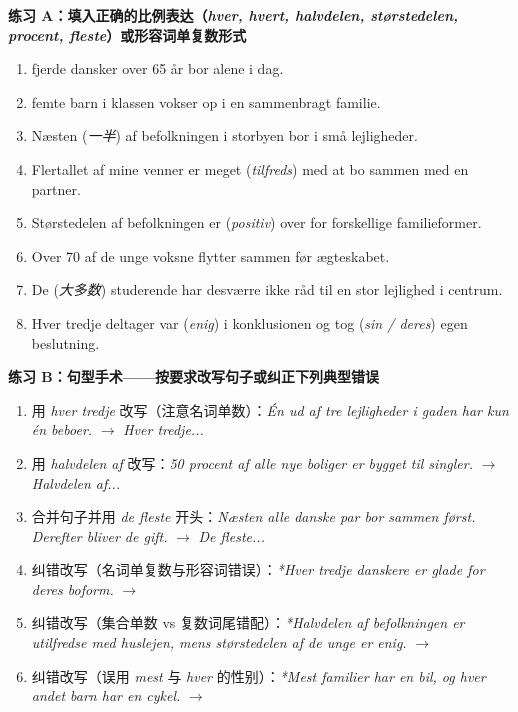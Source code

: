 \textbf{练习 A：填入正确的比例表达（\textit{hver, hvert, halvdelen, størstedelen, procent, fleste}）或形容词单复数形式}
\begin{enumerate}
  \item \underline{\hspace{1.4cm}} fjerde dansker over 65 år bor alene i dag.
  \item \underline{\hspace{1.4cm}} femte barn i klassen vokser op i en sammenbragt familie.
  \item Næsten \underline{\hspace{2.0cm}} (\textit{一半}) af befolkningen i storbyen bor i små lejligheder.
  \item Flertallet af mine venner er meget \underline{\hspace{1.8cm}} (\textit{tilfreds}) med at bo sammen med en partner.
  \item Størstedelen af befolkningen er \underline{\hspace{1.8cm}} (\textit{positiv}) over for forskellige familieformer.
  \item Over 70 \underline{\hspace{1.8cm}} af de unge voksne flytter sammen før ægteskabet.
  \item De \underline{\hspace{1.6cm}} (\textit{大多数}) studerende har desværre ikke råd til en stor lejlighed i centrum.
  \item Hver tredje deltager var \underline{\hspace{1.6cm}} (\textit{enig}) i konklusionen og tog \underline{\hspace{1.2cm}} (\textit{sin / deres}) egen beslutning.
\end{enumerate}

\textbf{练习 B：句型手术——按要求改写句子或纠正下列典型错误}
\begin{enumerate}
  \item 用 \textit{hver tredje} 改写（注意名词单数）：\textit{Én ud af tre lejligheder i gaden har kun én beboer.} $\rightarrow$ \textit{Hver tredje...}
  \item 用 \textit{halvdelen af} 改写：\textit{50 procent af alle nye boliger er bygget til singler.} $\rightarrow$ \textit{Halvdelen af...}
  \item 合并句子并用 \textit{de fleste} 开头：\textit{Næsten alle danske par bor sammen først. Derefter bliver de gift.} $\rightarrow$ \textit{De fleste...}
  \item 纠错改写（名词单复数与形容词错误）：\textit{*Hver tredje danskere er glade for deres boform.} $\rightarrow$
  \item 纠错改写（集合单数 vs 复数词尾错配）：\textit{*Halvdelen af befolkningen er utilfredse med huslejen, mens størstedelen af de unge er enig.} $\rightarrow$
  \item 纠错改写（误用 \textit{mest} 与 \textit{hver} 的性别）：\textit{*Mest familier har en bil, og hver andet barn har en cykel.} $\rightarrow$
\end{enumerate}

